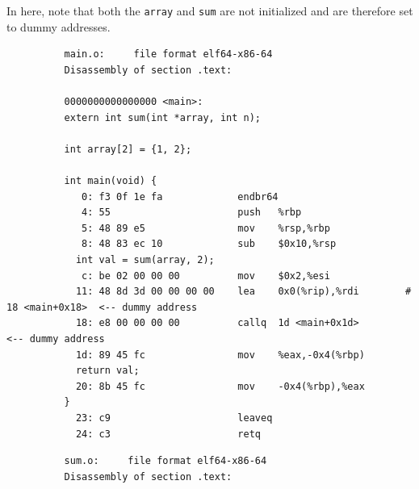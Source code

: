 \documentclass{article}
\begin{document}
      \begin{example}
        In here, note that both the \texttt{array} and \texttt{sum} are not initialized and are therefore set to dummy addresses. 
        \begin{lstlisting}
          main.o:     file format elf64-x86-64
          Disassembly of section .text:

          0000000000000000 <main>:
          extern int sum(int *array, int n); 

          int array[2] = {1, 2}; 

          int main(void) {
             0:	f3 0f 1e fa          	endbr64 
             4:	55                   	push   %rbp
             5:	48 89 e5             	mov    %rsp,%rbp
             8:	48 83 ec 10          	sub    $0x10,%rsp
            int val = sum(array, 2); 
             c:	be 02 00 00 00       	mov    $0x2,%esi
            11:	48 8d 3d 00 00 00 00 	lea    0x0(%rip),%rdi        # 18 <main+0x18>  <-- dummy address
            18:	e8 00 00 00 00       	callq  1d <main+0x1d>                          <-- dummy address
            1d:	89 45 fc             	mov    %eax,-0x4(%rbp)
            return val; 
            20:	8b 45 fc             	mov    -0x4(%rbp),%eax
          }
            23:	c9                   	leaveq 
            24:	c3                   	retq  
        \end{lstlisting}
        \begin{lstlisting}
          sum.o:     file format elf64-x86-64
          Disassembly of section .text:


\end{lstlisting}
\end{example}
\end{document}
